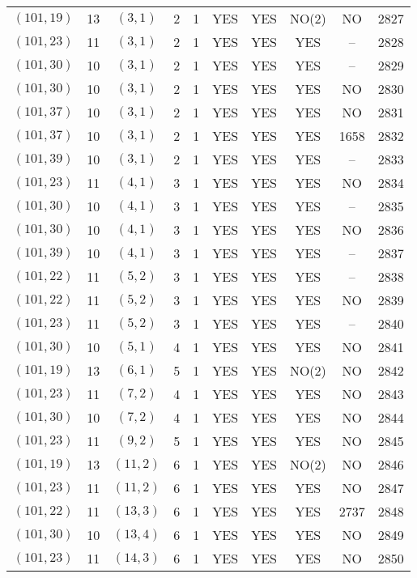 \begin{longtable}{|c|c|c|c|c|c|c|c|c|c|}
$(101, 19)$ & 13 & $(3, 1)$ & 2 & 1 & YES & YES & NO(2) & NO & 2827\\
$(101, 23)$ & 11 & $(3, 1)$ & 2 & 1 & YES & YES & YES & -- & 2828\\
$(101, 30)$ & 10 & $(3, 1)$ & 2 & 1 & YES & YES & YES & -- & 2829\\
$(101, 30)$ & 10 & $(3, 1)$ & 2 & 1 & YES & YES & YES & NO & 2830\\
$(101, 37)$ & 10 & $(3, 1)$ & 2 & 1 & YES & YES & YES & NO & 2831\\
$(101, 37)$ & 10 & $(3, 1)$ & 2 & 1 & YES & YES & YES & 1658 & 2832\\
$(101, 39)$ & 10 & $(3, 1)$ & 2 & 1 & YES & YES & YES & -- & 2833\\
$(101, 23)$ & 11 & $(4, 1)$ & 3 & 1 & YES & YES & YES & NO & 2834\\
$(101, 30)$ & 10 & $(4, 1)$ & 3 & 1 & YES & YES & YES & -- & 2835\\
$(101, 30)$ & 10 & $(4, 1)$ & 3 & 1 & YES & YES & YES & NO & 2836\\
$(101, 39)$ & 10 & $(4, 1)$ & 3 & 1 & YES & YES & YES & -- & 2837\\
$(101, 22)$ & 11 & $(5, 2)$ & 3 & 1 & YES & YES & YES & -- & 2838\\
$(101, 22)$ & 11 & $(5, 2)$ & 3 & 1 & YES & YES & YES & NO & 2839\\
$(101, 23)$ & 11 & $(5, 2)$ & 3 & 1 & YES & YES & YES & -- & 2840\\
$(101, 30)$ & 10 & $(5, 1)$ & 4 & 1 & YES & YES & YES & NO & 2841\\
$(101, 19)$ & 13 & $(6, 1)$ & 5 & 1 & YES & YES & NO(2) & NO & 2842\\
$(101, 23)$ & 11 & $(7, 2)$ & 4 & 1 & YES & YES & YES & NO & 2843\\
$(101, 30)$ & 10 & $(7, 2)$ & 4 & 1 & YES & YES & YES & NO & 2844\\
$(101, 23)$ & 11 & $(9, 2)$ & 5 & 1 & YES & YES & YES & NO & 2845\\
$(101, 19)$ & 13 & $(11, 2)$ & 6 & 1 & YES & YES & NO(2) & NO & 2846\\
$(101, 23)$ & 11 & $(11, 2)$ & 6 & 1 & YES & YES & YES & NO & 2847\\
$(101, 22)$ & 11 & $(13, 3)$ & 6 & 1 & YES & YES & YES & 2737 & 2848\\
$(101, 30)$ & 10 & $(13, 4)$ & 6 & 1 & YES & YES & YES & NO & 2849\\
$(101, 23)$ & 11 & $(14, 3)$ & 6 & 1 & YES & YES & YES & NO & 2850\\

\end{longtable}

